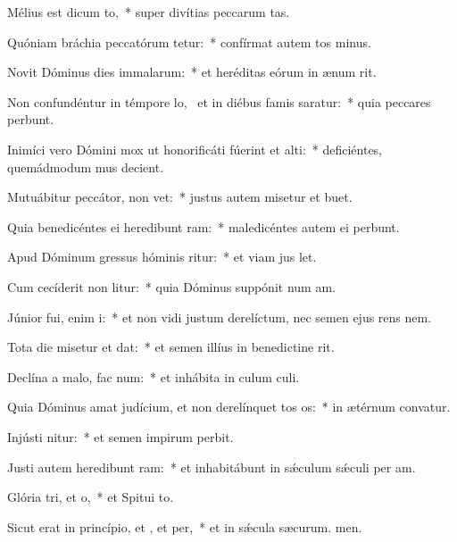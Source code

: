 \item Mélius est dicum to,~* super divítias peccarum tas.
\item Quóniam bráchia peccatórum tetur:~* confírmat autem tos minus.
\item Novit Dóminus dies immalarum:~* et heréditas eórum in ænum rit.
\item Non confundéntur in témpore lo,~\pscross{} et in diébus famis saratur:~* quia peccares perbunt.
\item Inimíci vero Dómini mox ut honorificáti fúerint et alti:~* deficiéntes, quemádmodum mus decient.
\item Mutuábitur peccátor,  non vet:~* justus autem misetur et buet.
\item Quia benedicéntes ei heredibunt ram:~* maledicéntes autem ei perbunt.
\item Apud Dóminum gressus hóminis ritur:~* et viam jus let.
\item Cum cecíderit non litur:~* quia Dóminus suppónit num am.
\item Júnior fui, enim i:~* et non vidi justum derelíctum, nec semen ejus rens nem.
\item Tota die misetur et dat:~* et semen illíus in benedictine rit.
\item Declína a malo,  fac num:~* et inhábita in culum culi.
\item Quia Dóminus amat judícium, et non derelínquet tos os:~* in ætérnum convatur.
\item Injústi nitur:~* et semen impirum perbit.
\item Justi autem heredibunt ram:~* et inhabitábunt in sǽculum sǽculi per am.
\item Glória tri, et o,~* et Spitui to.
\item Sicut erat in princípio, et , et per,~* et in sǽcula sæcurum. men.
